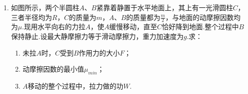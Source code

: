 \begin{enumerate}[leftmargin=0em]



\item
{}
如图所示，两个半圆柱$ A $、$ B $紧靠着静置于水平地面上，其上有一光滑圆柱$ C $，三者半径均为$ R $，$ C $的质量为$ m $，$ A $、$ B $的质量都为$ \frac{m}{2} $，与地面的动摩擦因数均为$ \mu $.现用水平向右的力拉$ A $，使$ A $缓慢移动，直至$ C $恰好降到地面.整个过程中$ B $保持静止.设最大静摩擦力等于滑动摩擦力，重力加速度为$ g $.求：
\begin{enumerate}
\renewcommand{\labelenumi}{\arabic{enumi}.}
\item
未拉$ A $时，$ C $受到$ B $作用力的大小$ F $；
\item 
动摩擦因数的最小值$ \mu _{min} $；
\item 
$ A $移动的整个过程中，拉力做的功$ W $.



\end{enumerate}
\begin{figure}[h!]
\flushright

\end{figure}

\end{enumerate}
